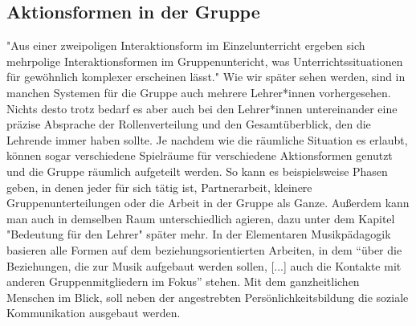 \subsection{Aktionsformen in der Gruppe}
"Aus einer zweipoligen Interaktionsform im Einzelunterricht ergeben sich
mehrpolige Interaktionsformen im Gruppenuntericht, was Unterrichtssituationen
für gewöhnlich komplexer erscheinen lässt."
\autocite[30]{losert:die_kunst_zu_unterrichten} Wie wir später sehen
werden, sind in manchen Systemen für die Gruppe auch mehrere Lehrer*innen
vorhergesehen. Nichts desto trotz bedarf es aber auch bei den Lehrer*innen
untereinander eine präzise Absprache der Rollenverteilung und den
Gesamtüberblick, den die Lehrende immer haben sollte. Je nachdem wie die
räumliche Situation es erlaubt, können sogar verschiedene Spielräume für
verschiedene Aktionsformen genutzt und die Gruppe räumlich aufgeteilt werden. So
kann es beispielsweise Phasen geben, in denen jeder für sich tätig ist,
Partnerarbeit, kleinere Gruppenunterteilungen oder die Arbeit in der Gruppe als
Ganze. Außerdem kann man auch in demselben Raum unterschiedlich agieren, dazu
unter dem Kapitel "Bedeutung für den Lehrer" später mehr. 
In der Elementaren Musikpädagogik basieren alle Formen auf dem
beziehungsorientierten Arbeiten, in dem \enquote{über die Beziehungen, die zur
Musik aufgebaut werden sollen, [...] auch die Kontakte mit anderen
Gruppenmitgliedern im Fokus} \autocite[10]{dartsch:kern_des_musizierens} stehen.
Mit dem ganzheitlichen Menschen im Blick, soll neben der angestrebten
Persönlichkeitsbildung die soziale Kommunikation ausgebaut werden.

